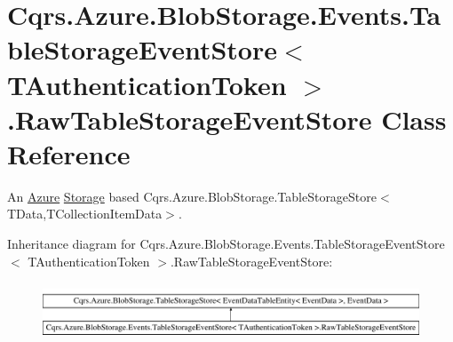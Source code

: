 \hypertarget{classCqrs_1_1Azure_1_1BlobStorage_1_1Events_1_1TableStorageEventStore_1_1RawTableStorageEventStore}{}\section{Cqrs.\+Azure.\+Blob\+Storage.\+Events.\+Table\+Storage\+Event\+Store$<$ T\+Authentication\+Token $>$.Raw\+Table\+Storage\+Event\+Store Class Reference}
\label{classCqrs_1_1Azure_1_1BlobStorage_1_1Events_1_1TableStorageEventStore_1_1RawTableStorageEventStore}


An \hyperlink{namespaceCqrs_1_1Azure}{Azure} \hyperlink{namespaceCqrs_1_1Azure_1_1Storage}{Storage} based Cqrs.\+Azure.\+Blob\+Storage.\+Table\+Storage\+Store$<$\+T\+Data,\+T\+Collection\+Item\+Data$>$.  


Inheritance diagram for Cqrs.\+Azure.\+Blob\+Storage.\+Events.\+Table\+Storage\+Event\+Store$<$ T\+Authentication\+Token $>$.Raw\+Table\+Storage\+Event\+Store\+:\begin{figure}[H]
\begin{center}
\leavevmode
\includegraphics[height=1.723077cm]{classCqrs_1_1Azure_1_1BlobStorage_1_1Events_1_1TableStorageEventStore_1_1RawTableStorageEventStore}
\end{center}
\end{figure}
